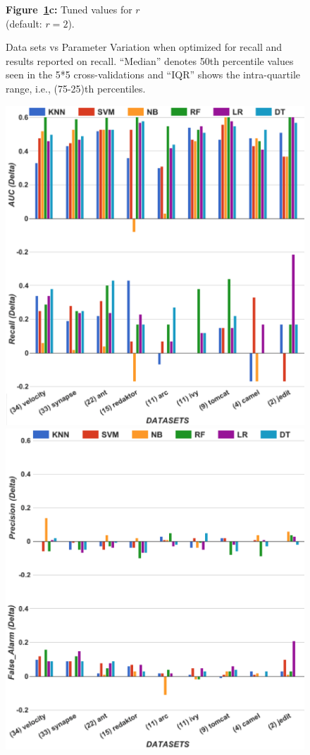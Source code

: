 \documentclass[sigconf]{acmart}
\theoremstyle{break}
\begin{document}
\begin{figure}[!t]
\begin{minipage}{.33\textwidth}
        {\bf Figure~\ref{fig:para}c:} Tuned values for $r$\\ (default:  $r=2$).
    \end{minipage}
    \vspace{-0.2cm}
    \caption{Data sets vs Parameter Variation when optimized for recall and results reported on recall.
    ``Median'' denotes 50th percentile values seen in the 5*5 cross-validations and ``IQR'' shows the intra-quartile
    range, i.e., (75-25)th percentiles.}
    \label{fig:para}
\end{figure}


\begin{figure}[!t]
\begin{minipage}{.5\linewidth}
\centering
 
        \includegraphics[width=0.75\linewidth,keepaspectratio,trim=0cm 1cm 0cm 2cm]{./fig/AUC_recall_tuned.png}
    \end{minipage}%
\begin{minipage}{.5\linewidth}
        \centering
        \includegraphics[width=0.75\linewidth,keepaspectratio,trim=0cm 1cm 0cm 2cm]{./fig/prec_pf_tuned.png}
    \end{minipage}%
    

\end{figure}
\end{document}
